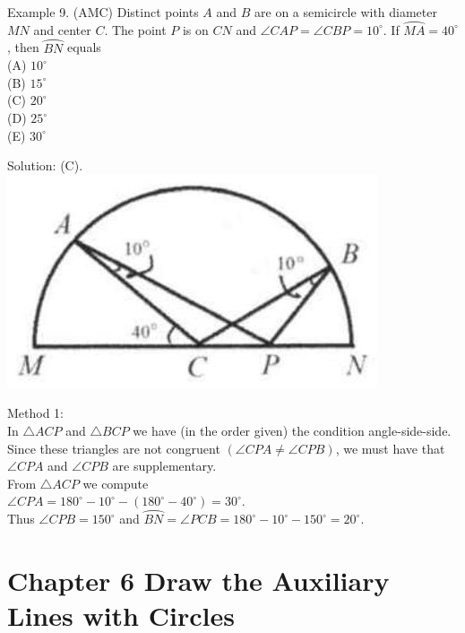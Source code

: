 \documentclass[10pt]{article}
\begin{document}
Example 9. (AMC) Distinct points \(A\) and \(B\) are on a semicircle with diameter \(M N\) and center \(C\). The point \(P\) is on \(C N\) and \(\angle C A P=\angle C B P=10^{\circ}\). If \(\wideparen{M A}=40^{\circ}\), then \(\wideparen{B N}\) equals\\
(A) \(10^{\circ}\)\\
(B) \(15^{\circ}\)\\
(C) \(20^{\circ}\)\\
(D) \(25^{\circ}\)\\
(E) \(30^{\circ}\)

Solution: (C).\\
\includegraphics[max width=\textwidth, center]{2025_04_17_97bc1f7e44d93c271a88g-203(2)}

Method 1:\\
In \(\triangle A C P\) and \(\triangle B C P\) we have (in the order given) the condition angle-side-side.\\
Since these triangles are not congruent \((\angle C P A \neq \angle C P B)\), we must have that \(\angle C P A\) and \(\angle C P B\) are supplementary.\\
From \(\triangle A C P\) we compute\\
\(\angle C P A=180^{\circ}-10^{\circ}-\left(180^{\circ}-40^{\circ}\right)=30^{\circ}\).\\
Thus \(\angle C P B=150^{\circ}\) and \(\wideparen{B N}=\angle P C B=180^{\circ}-10^{\circ}-150^{\circ}=20^{\circ}\).

\section*{Chapter 6 Draw the Auxiliary Lines with Circles}
\end{document}
